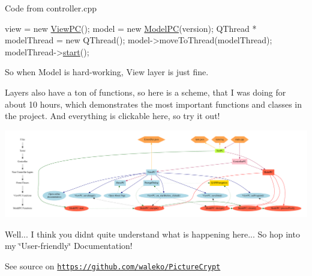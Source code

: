 Code from controller.\+cpp 
\begin{DoxyCode}
view = \textcolor{keyword}{new} \mbox{\hyperlink{class_view_p_c}{ViewPC}}();
model = \textcolor{keyword}{new} \mbox{\hyperlink{class_model_p_c}{ModelPC}}(version);
QThread * modelThread = \textcolor{keyword}{new} QThread();
model->moveToThread(modelThread);
modelThread->\mbox{\hyperlink{class_model_p_c_a3cae34fd5bcb06e8c1f8cfe7961bd270}{start}}();
\end{DoxyCode}
 So when Model is hard-\/working, View layer is just fine.

Layers also have a ton of functions, so here is a scheme, that I was doing for about 10 hours, which demonstrates the most important functions and classes in the project. And everything is clickable here, so try it out! 
\begin{DoxyImageNoCaption}
  \mbox{\includegraphics[width=\textwidth,height=\textheight/2,keepaspectratio=true]{dot_mainpage}}
\end{DoxyImageNoCaption}
 Well... I think you didn\textquotesingle{}t quite understand what is happening here... So hop into my \char`\"{}\+User-\/friendly\char`\"{} Documentation!

See source on \href{https://github.com/waleko/PictureCrypt}{\tt https\+://github.\+com/waleko/\+Picture\+Crypt}

